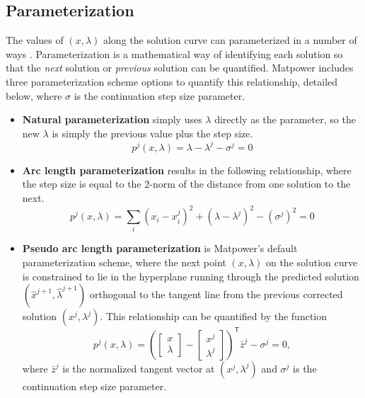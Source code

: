 \documentclass[12pt]{article}
\newcommand{\matpower}[0]{{\sc Matpower}}
\newcommand{\trans}[1]{{#1}^{\ensuremath{\mathsf{T}}}}  %
\numberwithin{equation}{section}
\numberwithin{table}{section}
\numberwithin{figure}{section}
\begin{document}
\subsection{Parameterization}

The values of $(x, \lambda)$ along the solution curve can parameterized in a number of ways \cite{chiang1995, li2008}. Parameterization is a mathematical way of identifying each solution so that the \emph{next} solution or \emph{previous} solution can be quantified. \matpower{} includes three parameterization scheme options to quantify this relationship, detailed below, where $\sigma$ is the continuation step size parameter.

\begin{itemize}

\item{\bf Natural parameterization} simply uses $\lambda$ directly as the parameter, so the new $\lambda$ is simply the previous value plus the step size.
\begin{equation}
p^j(x,\lambda) = \lambda - \lambda^j - \sigma^j = 0
\label{eq:natural_parm}
\end{equation}

\item {\bf Arc length parameterization} results in the following relationship, where the step size is equal to the 2-norm of the distance from one solution to the next.
\begin{equation}
p^j(x,\lambda) = \sum\limits_i(x_i - x_i^j)^2 + (\lambda - \lambda^j)^2 - (\sigma^j)^2 = 0
\label{eq:arc_parm}
\end{equation}
\item {\bf Pseudo arc length parameterization} \cite{mori2002} is \matpower{}'s default parameterization scheme, where the next point $(x,\lambda)$ on the solution curve is constrained to lie in the hyperplane running through the predicted solution $(\hat{x}^{j+1}, \hat{\lambda}^{j+1})$ orthogonal to the tangent line from the previous corrected solution $(x^j,\lambda^j)$. This relationship can be quantified by the function
\begin{equation}
p^j(x,\lambda) = \trans{ \left(\left[\begin{array}{c}x \\ \lambda\end{array}\right] - \left[\begin{array}{c}x^{j} \\ \lambda^j\end{array}\right]\right) } \bar{z}^j -\sigma^j = 0,
\label{eq:psuedo_arc_parm}
\end{equation}
where $\bar{z}^j$ is the normalized tangent vector at $(x^j, \lambda^j)$ and $\sigma^j$ is the continuation step size parameter.

\end{itemize}
\end{document}
